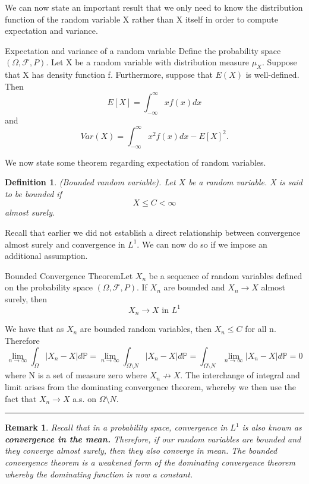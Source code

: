 \documentclass[twoside]{article}
\newtheorem{definition}[theorem]{Definition}
\newtheorem{remark}[theorem]{Remark}
\newenvironment{proof}{{\bf Proof:}}{\hfill\rule{2mm}{2mm}}
\newcommand{\sigmalgebra}{\mathcal{F}}
\newcommand{\prob}{\mathbb{P}}
\begin{document}
We can now state an important result that we only need to know the distribution function of the random variable X rather than X itself in order to compute expectation and variance.



\begin{proposition_exam}{Expectation and variance of a random variable}{} Define the probability space $(\Omega, \sigmalgebra, P)$. Let X be a random variable with distribution measure $\mu_X$. Suppose that X has density function f. Furthermore, suppose that $E(X)$ is well-defined. Then 
$$
E[X] = \int_{-\infty}^{\infty}xf(x)dx
$$
and 
$$
Var(X) = \int_{-\infty}^{\infty}x^2f(x)dx - E[X]^2.
$$
\end{proposition_exam}


We now state some theorem regarding expectation of random variables.

\begin{definition}(Bounded random variable). Let $X$ be a random variable. X is said to be bounded if 
$$
X \leq C < \infty
$$
almost surely.
\end{definition}

Recall that earlier we did not establish a direct relationship between convergence almost surely and convergence in $L^1.$ We can now do so if we impose an additional assumption.

\begin{theorem_exam}{Bounded Convergence Theorem}{}Let $X_n$ be a sequence of random variables defined on the probability space $(\Omega, \mathcal{F}, P).$ If $X_n$ are bounded and $X_n \rightarrow X$ almost surely, then 
$$
X_n \rightarrow X \text{ in } L^1
$$
\end{theorem_exam}

\begin{proof} We have that as $X_n$ are bounded random variables, then $X_n \leq C$ for all n. Therefore 
$$
\lim_{n \rightarrow \infty}\int_{\Omega}|X_n - X|d\prob = \lim_{n \rightarrow \infty}\int_{\Omega \setminus N}|X_n - X|d\prob = \int_{\Omega \setminus N}\lim_{n \rightarrow \infty}|X_n - X|d\prob = 0
$$
where N is a set of measure zero where $X_n \not \rightarrow X.$ The interchange of integral and limit arises from the dominating convergence theorem, whereby we then use the fact that $X_n \rightarrow X$ a.s. on $\Omega \setminus N.$
\end{proof}

\begin{remark}Recall that in a probability space, convergence in $L^1$ is also known as \textbf{convergence in the mean.} Therefore, if our random variables are bounded and they converge almost surely, then they also converge in mean. The bounded convergence theorem is a weakened form of the dominating convergence theorem whereby the dominating function is now a constant.
\end{remark}
\end{document}
